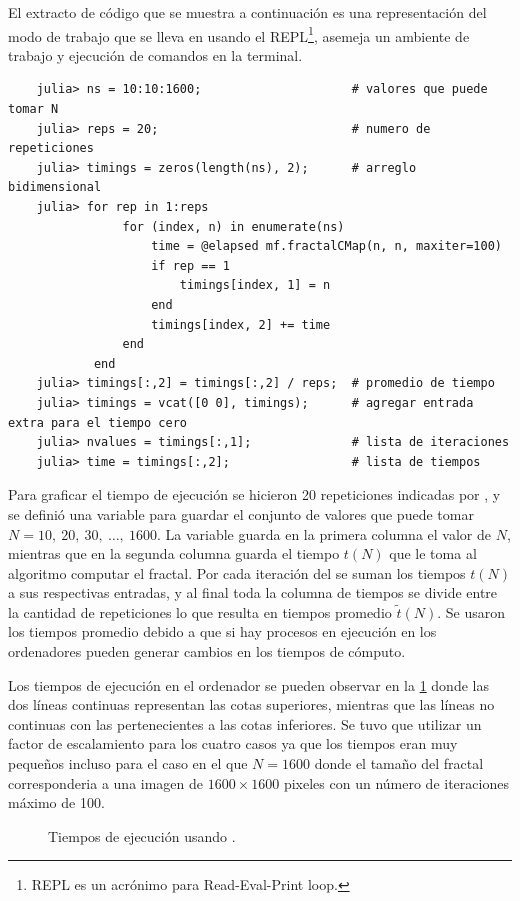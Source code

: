 El extracto de código que se muestra a continuación es una representación del modo de trabajo que se lleva en  usando el REPL\footnote{REPL es un acrónimo para Read-Eval-Print loop.}, asemeja un ambiente de trabajo y ejecución de comandos en la terminal.
\begin{listing}[ht!]
    \begin{verbatim}
    julia> ns = 10:10:1600;                     # valores que puede tomar N
    julia> reps = 20;                           # numero de repeticiones
    julia> timings = zeros(length(ns), 2);      # arreglo bidimensional
    julia> for rep in 1:reps
                for (index, n) in enumerate(ns)
                    time = @elapsed mf.fractalCMap(n, n, maxiter=100)
                    if rep == 1
                        timings[index, 1] = n
                    end
                    timings[index, 2] += time
                end
            end
    julia> timings[:,2] = timings[:,2] / reps;  # promedio de tiempo
    julia> timings = vcat([0 0], timings);      # agregar entrada extra para el tiempo cero
    julia> nvalues = timings[:,1];              # lista de iteraciones
    julia> time = timings[:,2];                 # lista de tiempos
    \end{verbatim}
\end{listing}

Para graficar el tiempo de ejecución se hicieron 20 repeticiones indicadas por , y se definió una variable  para guardar el conjunto de valores que puede tomar $N = 10,\ 20,\ 30,\ \ldots,\ 1600$. La variable  guarda en la primera columna el valor de $N$, mientras que en la segunda columna guarda el tiempo $t(N)$ que le toma al algoritmo computar el fractal. Por cada iteración del  se suman los tiempos $t(N)$ a sus respectivas entradas, y al final toda la columna de tiempos se divide entre la cantidad de repeticiones  lo que resulta en tiempos promedio $\tilde{t}(N)$. Se usaron los tiempos promedio debido a que si hay procesos en ejecución en los ordenadores pueden generar cambios en los tiempos de cómputo.

Los tiempos de ejecución en el ordenador {\diannao} se pueden observar en la \cref{fig:times-hongdiannao} donde las dos líneas continuas representan las cotas superiores, mientras que las líneas no continuas con las pertenecientes a las cotas inferiores. Se tuvo que utilizar un factor de escalamiento para los cuatro casos ya que los tiempos eran muy pequeños incluso para el caso en el que $N = 1600$ donde el tamaño del fractal corresponderia a una imagen de $1600 \times 1600$ pixeles con un número de iteraciones máximo de 100.
\begin{figure}[ht!]
    \centering
    
    \caption{Tiempos de ejecución usando \hongdiannao.}
    \label{fig:times-hongdiannao}
\end{figure}


